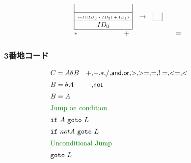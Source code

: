 \documentclass[dvipdfmx]{beamer}
\begin{document}
\begin{frame}
\[\begin{array}{cccccccc}
      \multicolumn{3}{c}{
        \begin{array}{|c|}
          \                             \\\hline
          \mbox{\tiny $val((ID_3*ID_2)+ID_1)$} \\\hline
          ID_0                          \\\hline
        \end{array}}
                                     & \rightarrow &
      \begin{array}{|c|}
        \ \\\hline
      \end{array}                              \\
      \mbox{$*$}                     &             &
      \multicolumn{3}{c}{\mbox{$+$}} &             &
      \mbox{$=$}                                     \\
    \end{array}
  \]
\end{frame}

\begin{frame}
  \frametitle{3番地コード}
  \[
    \begin{array}{lp{.5\textwidth}}
      C = A\theta B & $+$,$-$,$*$,$/$,$\mathsf{and}$,$\mathsf{or}$,$>$,$>=$,$=$,$!=$,$<=$,$<$ \\[5pt]
      B = \theta A  & $-$,$\mathsf{not}$                                                      \\[5pt]
      B = A                                                                                   \\[5pt]
      \multicolumn{2}{l}{\mbox{\greentext{Jump on condition}}}                                \\[5pt]
      \multicolumn{2}{l}{\mathtt{if}\ A\ \mathtt{goto}\ L}                                    \\[5pt]
      \multicolumn{2}{l}{\mathtt{if}\ not A\ \mathtt{goto}\ L}                                \\[5pt]
      \multicolumn{2}{l}{\mbox{\greentext{Unconditional Jump}}}                               \\[5pt]
      \multicolumn{2}{l}{\mathtt{goto}\ L}
    \end{array}
  \]
\end{frame}
\end{document}
